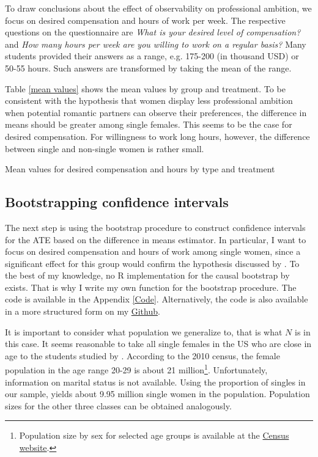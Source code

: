 \documentclass[aodsor,preprint]{imsart}
\numberwithin{equation}{section}
\theoremstyle{plain}
\begin{document}


To draw conclusions about the effect of observability on professional ambition, we focus on desired compensation and hours of work per week. The respective questions on the questionnaire are \textit{What is your desired level of compensation?} and \textit{How many hours per week are you willing to work on a regular basis?} Many students provided their answers as a range, e.g. 175-200 (in thousand USD) or 50-55 hours. Such answers are transformed by taking the mean of the range.

Table \ref{mean values} shows the mean values by group and treatment. To be consistent with the hypothesis that women display less professional ambition when potential romantic partners can observe their preferences, the difference in means should be greater among single females. This seems to be the case for desired compensation. For willingness to work long hours, however, the difference between single and non-single women is rather small. 

\begin{table}[!h]
	\centering
	\caption{Mean values for desired compensation and hours by type and treatment}
	\label{mean values}
	
\end{table}


\subsection{Bootstrapping confidence intervals}

The next step is using the bootstrap procedure to construct confidence intervals for the ATE based on the difference in means estimator. In particular, I want to focus on desired compensation and hours of work among single women, since a significant effect for this group would confirm the hypothesis discussed by \cite{Bursztyn_2017}. To the best of my knowledge, no R implementation for the causal bootstrap by \cite{Imbens_2021} exists. That is why I write my own function for the bootstrap procedure. The code is available in the Appendix \ref{Code}. Alternatively, the code is also available in a more structured form on my \href{https://github.com/gregorsteiner/CausalBootstrap}{Github}.

It is important to consider what population we generalize to, that is what $N$ is in this case. It seems reasonable to take all single females in the US who are close in age to the students studied by \cite{Bursztyn_2017}. According to the 2010 census, the female population in the age range 20-29 is about 21 million\footnote{Population size by sex for selected age groups is available at the \href{https://www.census.gov/data/tables/time-series/demo/popest/2010s-national-detail.html}{Census website}.}. Unfortunately, information on marital status is not available. Using the proportion of singles in our sample, yields about 9.95 million single women in the population. Population sizes for the other three classes can be obtained analogously.
\end{document}
